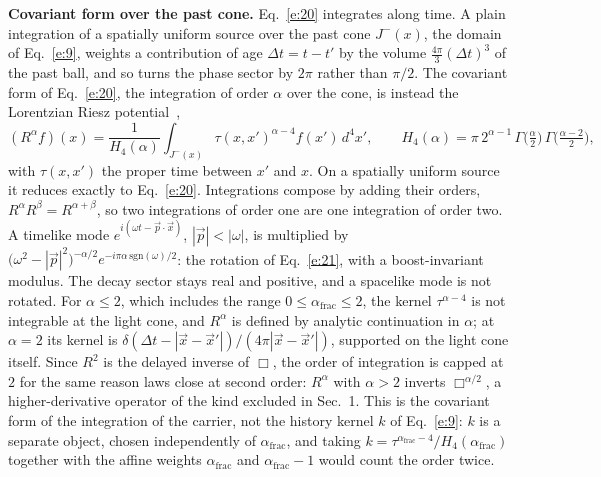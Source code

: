 \documentclass[10pt]{article}
\newcommand{\afrac}{\alpha_{\mathrm{frac}}}
\begin{document}
\noindent\textbf{Covariant form over the past cone.} Eq.~\eqref{e:20} integrates along time. A plain integration of a spatially uniform source over the past cone $J^-(x)$, the domain of Eq.~\eqref{e:9}, weights a contribution of age $\Delta t=t-t'$ by the volume $\frac{4\pi}{3}(\Delta t)^3$ of the past ball, and so turns the phase sector by $2\pi$ rather than $\pi/2$. The covariant form of Eq.~\eqref{e:20}, the integration of order $\alpha$ over the cone, is instead the Lorentzian Riesz potential~\cite{riesz},
\begin{equation*}
(R^\alpha f)(x)=\frac{1}{H_4(\alpha)}\int_{J^-(x)}\tau(x,x')^{\alpha-4}f(x')\,d^4x',\qquad H_4(\alpha)=\pi\,2^{\alpha-1}\,\Gamma\bigl(\tfrac{\alpha}{2}\bigr)\,\Gamma\bigl(\tfrac{\alpha-2}{2}\bigr),
\end{equation*}
with $\tau(x,x')$ the proper time between $x'$ and $x$. On a spatially uniform source it reduces exactly to Eq.~\eqref{e:20}. Integrations compose by adding their orders, $R^\alpha R^\beta=R^{\alpha+\beta}$, so two integrations of order one are one integration of order two. A timelike mode $e^{i(\omega t-\vec p\cdot\vec x)}$, $|\vec p|<|\omega|$, is multiplied by $\bigl(\omega^2-|\vec p|^2\bigr)^{-\alpha/2}e^{-i\pi\alpha\,\mathrm{sgn}(\omega)/2}$: the rotation of Eq.~\eqref{e:21}, with a boost-invariant modulus. The decay sector stays real and positive, and a spacelike mode is not rotated. For $\alpha\le2$, which includes the range $0\le\afrac\le2$, the kernel $\tau^{\alpha-4}$ is not integrable at the light cone, and $R^\alpha$ is defined by analytic continuation in $\alpha$; at $\alpha=2$ its kernel is $\delta(\Delta t-|\vec x-\vec x'|)/(4\pi|\vec x-\vec x'|)$, supported on the light cone itself. Since $R^2$ is the delayed inverse of $\Box$, the order of integration is capped at $2$ for the same reason laws close at second order: $R^\alpha$ with $\alpha>2$ inverts $\Box^{\alpha/2}$, a higher-derivative operator of the kind excluded in Sec.~1. This is the covariant form of the integration of the carrier, not the history kernel $k$ of Eq.~\eqref{e:9}: $k$ is a separate object, chosen independently of $\afrac$, and taking $k=\tau^{\afrac-4}/H_4(\afrac)$ together with the affine weights $\afrac$ and $\afrac-1$ would count the order twice.
\end{document}
